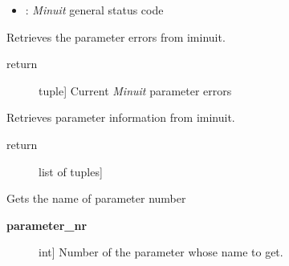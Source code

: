 \documentclass[a4paper,10pt,english]{sphinxmanual}
\begin{document}
\begin{fulllineitems}
\begin{fulllineitems}
\begin{description}
\begin{itemize}
\item {} 
: \emph{Minuit} general status code

\end{itemize}

\end{description}

\end{fulllineitems}


\begin{fulllineitems}
\label{index:kafe.iminuit_wrapper.IMinuit.get_parameter_errors}
Retrieves the parameter errors from iminuit.
\begin{description}
\item[{return}] \leavevmode{[}tuple{]}
Current \emph{Minuit} parameter errors

\end{description}

\end{fulllineitems}


\begin{fulllineitems}
\label{index:kafe.iminuit_wrapper.IMinuit.get_parameter_info}
Retrieves parameter information from iminuit.
\begin{description}
\item[{return}] \leavevmode{[}list of tuples{]}

\end{description}

\end{fulllineitems}


\begin{fulllineitems}
\label{index:kafe.iminuit_wrapper.IMinuit.get_parameter_name}
Gets the name of parameter number 
\begin{description}
\item[{\textbf{parameter\_nr}}] \leavevmode{[}int{]}
Number of the parameter whose name to get.


\end{description}
\end{fulllineitems}
\end{fulllineitems}
\end{document}
